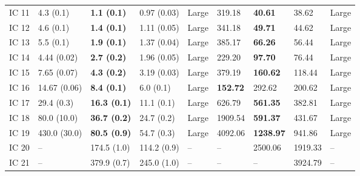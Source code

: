 \begin{tabular}{lllllllll}
IC 11 &          4.3 (0.1) &    \textbf{1.1 (0.1)} &        0.97 (0.03) &       Large &                  319.18 &              \textbf{40.61} &                    38.62 &       Large \\
IC 12 &          4.6 (0.1) &    \textbf{1.4 (0.1)} &        1.11 (0.05) &       Large &                  341.18 &              \textbf{49.71} &                    44.62 &       Large \\
IC 13 &          5.5 (0.1) &    \textbf{1.9 (0.1)} &        1.37 (0.04) &       Large &                  385.17 &              \textbf{66.26} &                    56.44 &       Large \\
IC 14 &        4.44 (0.02) &    \textbf{2.7 (0.2)} &        1.96 (0.05) &       Large &                  229.20 &              \textbf{97.70} &                    76.44 &       Large \\
IC 15 &        7.65 (0.07) &    \textbf{4.3 (0.2)} &        3.19 (0.03) &       Large &                  379.19 &             \textbf{160.62} &                   118.44 &       Large \\
IC 16 &       14.67 (0.06) &    \textbf{8.4 (0.1)} &          6.0 (0.1) &       Large &         \textbf{152.72} &                      292.62 &                   200.62 &       Large \\
IC 17 &         29.4 (0.3) &   \textbf{16.3 (0.1)} &         11.1 (0.1) &       Large &                  626.79 &             \textbf{561.35} &                   382.81 &       Large \\
IC 18 &        80.0 (10.0) &   \textbf{36.7 (0.2)} &         24.7 (0.2) &       Large &                 1909.54 &             \textbf{591.37} &                   431.67 &       Large \\
IC 19 &       430.0 (30.0) &   \textbf{80.5 (0.9)} &         54.7 (0.3) &       Large &                 4092.06 &            \textbf{1238.97} &                   941.86 &       Large \\
IC 20 &                 -- &           174.5 (1.0) &        114.2 (0.9) &          -- &                      -- &                     2500.06 &                  1919.33 &          -- \\
IC 21 &                 -- &           379.9 (0.7) &        245.0 (1.0) &          -- &                      -- &                          -- &                  3924.79 &          -- \\
\bottomrule
\end{tabular}
